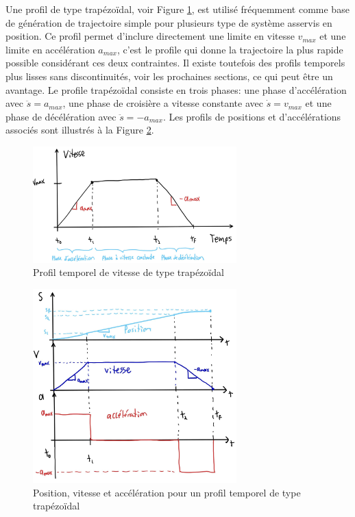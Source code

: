 Une profil de type trapézoïdal, voir Figure \ref{fig:trap_profile_speed}, est utilisé fréquemment comme base de génération de trajectoire simple pour plusieurs type de système asservis en position. Ce profil permet d'inclure directement une limite en vitesse $v_{max}$ et une limite en accélération $a_{max}$, c'est le profile qui donne la trajectoire la plus rapide possible considérant ces deux contraintes. Il existe toutefois des profils temporels plus lisses sans discontinuités, voir les prochaines sections, ce qui peut être un avantage. Le profile trapézoïdal consiste en trois phases: une phase d'accélération avec $\ddot{s} = a_{max}$, une phase de croisière a vitesse constante avec $\dot{s} = v_{max}$ et une phase de décélération avec $\ddot{s} = -a_{max}$. Les profils de positions et d'accélérations associés sont illustrés à la Figure \ref{fig:trap_profile_speed_all}.
\begin{figure}[htbp]
	\centering
		\includegraphics[width=0.70\textwidth]{fig/trap_profile_speed.jpg}
	\caption{Profil temporel de vitesse de type trapézoïdal}
	\label{fig:trap_profile_speed}
\end{figure}

\begin{figure}[htbp]
	\centering
		\includegraphics[width=0.70\textwidth]{fig/trap_profile_all.jpg}
	\caption{Position, vitesse et accélération pour un profil temporel de type trapézoïdal}
	\label{fig:trap_profile_speed_all}
\end{figure}

